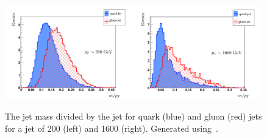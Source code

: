 \begin{figure}[ht!]
\centering
\includegraphics[width=0.49\textwidth]{figures/analysis/search2/misc/ak07_MDPt_0200.pdf}
\includegraphics[width=0.49\textwidth]{figures/analysis/search2/misc/ak07_MDPt_1600.pdf}
\caption{The jet mass divided by the jet \PT for quark (blue) and gluon (red) jets for a jet \PT of 200 (left) and 1600 \GeV (right). Generated using~\cite{Gallicchio:2011xq}.}
\label{fig:searchII:mpt_qvsg}
\end{figure}
\clearpage

